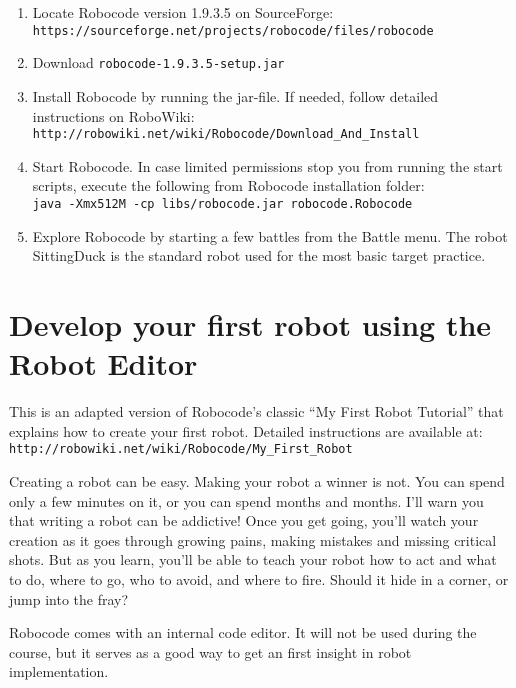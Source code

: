 \documentclass{scrreprt}
\begin{document}
\begin{enumerate}
\item Locate Robocode version 1.9.3.5 on SourceForge:\\\texttt{https://sourceforge.net/projects/robocode/files/robocode}
\item Download \texttt{robocode-1.9.3.5-setup.jar}
\item Install Robocode by running the jar-file. If needed, follow detailed instructions on RoboWiki:\\\texttt{http://robowiki.net/wiki/Robocode/Download\_And\_Install}
\item Start Robocode. In case limited permissions stop you from running the start scripts, execute the following from Robocode installation folder:\\
\texttt{java~-Xmx512M~-cp~libs/robocode.jar~robocode.Robocode}
\item Explore Robocode by starting a few battles from the Battle menu. The robot SittingDuck is the standard robot used for the most basic target practice.
\end{enumerate}

\section{Develop your first robot using the Robot Editor} \label{sec:myfirstrobot}
This is an adapted version of Robocode's classic ``My First Robot Tutorial'' that explains how to create your first robot. Detailed instructions are available at:\\\texttt{http://robowiki.net/wiki/Robocode/My\_First\_Robot}

Creating a robot can be easy. Making your robot a winner is not. You can spend only a few minutes on it, or you can spend months and months. I'll warn you that writing a robot can be addictive! Once you get going, you'll watch your creation as it goes through growing pains, making mistakes and missing critical shots. But as you learn, you'll be able to teach your robot how to act and what to do, where to go, who to avoid, and where to fire. Should it hide in a corner, or jump into the fray?

Robocode comes with an internal code editor. It will not be used during the course, but it serves as a good way to get an first insight in robot implementation.
\end{document}
